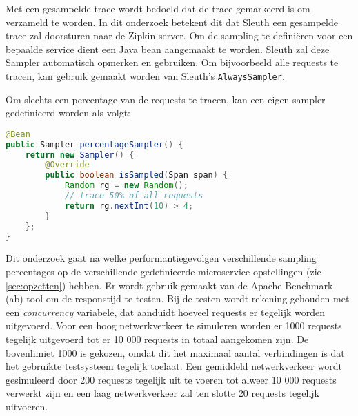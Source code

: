 Met een gesampelde trace wordt bedoeld dat de trace gemarkeerd is om verzameld te worden. In dit onderzoek betekent dit dat Sleuth een gesampelde trace zal doorsturen naar de Zipkin server. Om de sampling te definiëren voor een bepaalde service dient een Java bean aangemaakt te worden. Sleuth zal deze Sampler automatisch opmerken en gebruiken. Om bijvoorbeeld alle requests te tracen, kan gebruik gemaakt worden van Sleuth's \texttt{AlwaysSampler}.

Om slechts een percentage van de requests te tracen, kan een eigen sampler gedefinieerd worden als volgt:

\begin{lstlisting}[language=Java, basicstyle=\ttfamily\small, caption=Sleuth percentage sampler]
@Bean
public Sampler percentageSampler() {
    return new Sampler() {
        @Override
        public boolean isSampled(Span span) {
            Random rg = new Random();
            // trace 50% of all requests
            return rg.nextInt(10) > 4;
        }
    };
}
\end{lstlisting}

Dit onderzoek gaat na welke performantiegevolgen verschillende sampling percentages op de verschillende gedefinieerde microservice opstellingen (zie \ref{sec:opzetten}) hebben. Er wordt gebruik gemaakt van de Apache Benchmark (ab) tool om de responstijd te testen. Bij de testen wordt rekening gehouden met een \textit{concurrency} variabele, dat aanduidt hoeveel requests er tegelijk worden uitgevoerd. Voor een hoog netwerkverkeer te simuleren worden er 1000 requests tegelijk uitgevoerd tot er 10 000 requests in totaal aangekomen zijn. De bovenlimiet 1000 is gekozen, omdat dit het maximaal aantal verbindingen is dat het gebruikte testsysteem tegelijk toelaat. Een gemiddeld netwerkverkeer wordt gesimuleerd door 200 requests tegelijk uit te voeren tot alweer 10 000 requests verwerkt zijn en een laag netwerkverkeer zal ten slotte 20 requests tegelijk uitvoeren.


